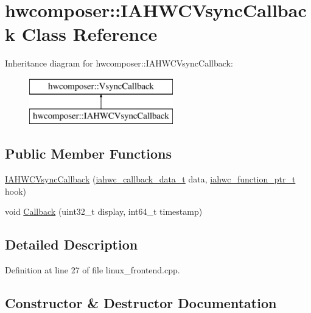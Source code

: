 \hypertarget{classhwcomposer_1_1IAHWCVsyncCallback}{}\section{hwcomposer\+:\+:I\+A\+H\+W\+C\+Vsync\+Callback Class Reference}
\label{classhwcomposer_1_1IAHWCVsyncCallback}
Inheritance diagram for hwcomposer\+:\+:I\+A\+H\+W\+C\+Vsync\+Callback\+:\begin{figure}[H]
\begin{center}
\leavevmode
\includegraphics[height=2.000000cm]{classhwcomposer_1_1IAHWCVsyncCallback}
\end{center}
\end{figure}
\subsection*{Public Member Functions}
\begin{DoxyCompactItemize}
\item 
\mbox{\hyperlink{classhwcomposer_1_1IAHWCVsyncCallback_a7710057d33beeaa74157a070aaad0972}{I\+A\+H\+W\+C\+Vsync\+Callback}} (\mbox{\hyperlink{iahwc_8h_a07fb4f73baa8a0cfbd40f64071e56a7c}{iahwc\+\_\+callback\+\_\+data\+\_\+t}} data, \mbox{\hyperlink{iahwc_8h_a214bf51cce821fdb7b24210088c12cad}{iahwc\+\_\+function\+\_\+ptr\+\_\+t}} hook)
\item 
void \mbox{\hyperlink{classhwcomposer_1_1IAHWCVsyncCallback_a8e89987e4a1f85b917f82166978ede94}{Callback}} (uint32\+\_\+t display, int64\+\_\+t timestamp)
\end{DoxyCompactItemize}


\subsection{Detailed Description}


Definition at line 27 of file linux\+\_\+frontend.\+cpp.



\subsection{Constructor \& Destructor Documentation}
\mbox{\label{classhwcomposer_1_1IAHWCVsyncCallback_a7710057d33beeaa74157a070aaad0972}} 
